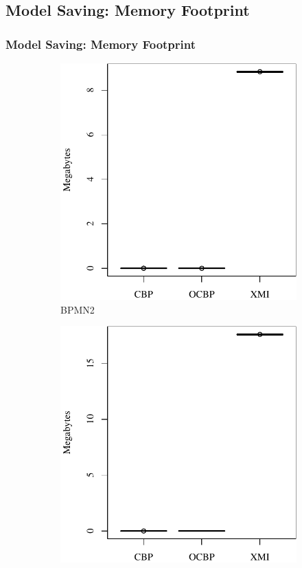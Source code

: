 \documentclass{beamer}
\begin{document}
\begin{frame}[fragile]
\section{Model Saving: Memory Footprint}
\frametitle{Model Saving: Memory Footprint}
\begin{figure}
    \begin{subfigure}{0.325\textwidth}
        \centering
        \includegraphics[width=\linewidth]{save_memory_bpmn2}
        \caption{BPMN2}
        \label{fig:save_memory_bpmn2}
    \end{subfigure}
    \hfill
    \begin{subfigure}{0.325\textwidth}
        \centering
        \includegraphics[width=\linewidth]{save_memory_epsilon}

\end{subfigure}
\end{figure}
\end{frame}
\end{document}
